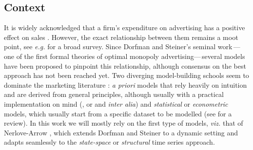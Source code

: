 
\subsection{Context}

It is widely acknowledged that a firm's expenditure  on advertising has a positive effect on sales \cite{assmus1984advertising, tellis2007advertising, luo2012does, wiesel2011practice}. However, the exact relationship between them remains a moot point, see \emph{e.g.} \cite{tellis2009generalizations} for a broad survey. Since Dorfman and Steiner's \cite{dorfman1954optimal} seminal work\,---one of the first formal theories of optimal monopoly advertising---\,several models have been proposed to pinpoint this relationship, although consensus on the best approach has not been reached yet. Two diverging model-building schools seem to dominate the marketing literature \cite{little1979aggregate}: \emph{a priori} models that rely heavily on intuition and are derived from general principles, although usually with a practical implementation on mind (\cite{nerlove1962optimal}, or \cite{vidale1957operations} and \cite{little1975brandaid} \emph{inter alia}) and  \emph{statistical} or \emph{econometric} models, which usually start from a specific dataset to be modelled (see \cite{assmus1984advertising} for a review). In this work we will mostly rely on the first type of models, \emph{viz.} that of Nerlove-Arrow \cite{nerlove1962optimal}, which extends  Dorfman and Steiner to a dynamic setting \cite{bagwell2007economic} and adapts seamlessly to the \emph{state-space} or \emph{structural} time series approach.



